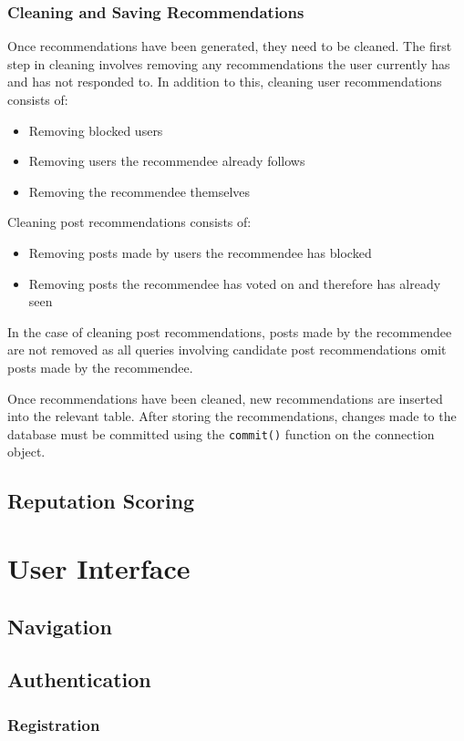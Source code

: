 \subsubsection{Cleaning and Saving Recommendations}
Once recommendations have been generated, they need to be cleaned. The first step in cleaning involves removing any recommendations the user currently has and has not responded to. In addition to this, cleaning user recommendations consists of:
\begin{itemize}
\item Removing blocked users
\item Removing users the recommendee already follows
\item Removing the recommendee themselves
\end{itemize}

\noindent Cleaning post recommendations consists of:
\begin{itemize}
\item Removing posts made by users the recommendee has blocked
\item Removing posts the recommendee has voted on and therefore has already seen
\end{itemize}

In the case of cleaning post recommendations, posts made by the recommendee are not removed as all queries involving candidate post recommendations omit posts made by the recommendee.

Once recommendations have been cleaned, new recommendations are inserted into the relevant table. After storing the recommendations, changes made to the database must be committed using the \texttt{commit()} function on the connection object.

\subsection{Reputation Scoring}

\section{User Interface}
\subsection{Navigation}
\subsection{Authentication}
\subsubsection{Registration}
